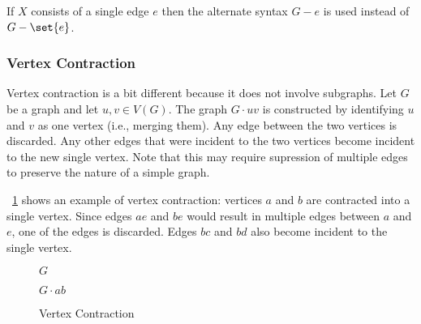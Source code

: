 If \(X\) consists of a single edge \(e\) then the alternate syntax \(G-e\) is used instead of \(G-\set{e}\).

\subsubsection{Vertex Contraction}\label{sec:sub:sub:contract}

Vertex contraction is a bit different because it does not involve subgraphs.  Let \(G\) be a graph and let \(u,v\in
V(G)\).  The graph \(G\cdot uv\) is constructed by identifying \(u\) and \(v\) as one vertex (i.e., merging them).
Any edge between the two vertices is discarded.  Any other edges that were incident to the two vertices become
incident to the new single vertex.  Note that this may require supression of multiple edges to preserve the nature
of a simple graph.

\figurename~\ref{fig:contract} shows an example of vertex contraction: vertices \(a\) and \(b\) are contracted into
a single vertex.  Since edges \(ae\) and \(be\) would result in multiple edges between \(a\) and \(e\), one of the
edges is discarded.  Edges \(bc\) and \(bd\) also become incident to the single vertex.

\begin{figure}[H]
  \label{fig:contract}
  \begin{minipage}{3in}
    \begin{center}

      \bigskip

      \(G\)
    \end{center}
  \end{minipage}
  \begin{minipage}{3in}
    \begin{center} 

      \bigskip

      \(G\cdot ab\)
    \end{center}
  \end{minipage}
  \caption{Vertex Contraction}
\end{figure}

